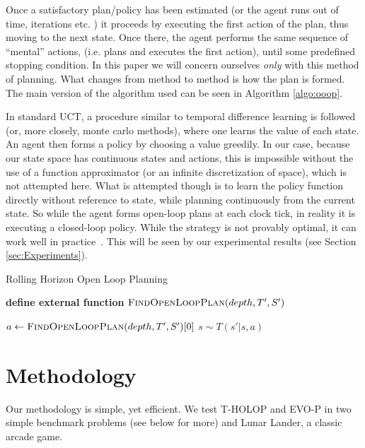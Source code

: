 \documentclass[conference]{IEEEtran}
\newcommand{\mathsc}[1]{{\normalfont\textsc{#1}}}
\begin{document}
Once a satisfactory plan/policy has been estimated (or the agent runs out of time, iterations etc. ) it proceeds by executing the first action of the plan, thus moving to the next state. Once there, the agent performs the same sequence of ``mental'' actions, (i.e. plans and executes the first action), until some predefined stopping condition.  In this paper we will concern ourselves \textit{only} with this method of planning. What changes from method to method is how the plan is formed. The main version of the algorithm used can be seen in Algorithm \ref{algo:ooop}.

In standard UCT, a procedure similar to temporal difference learning is followed (or, more closely, monte carlo methods), where one learns the value of each state. An agent then forms a policy by choosing a value greedily. In our case, because our state space has continuous states and actions, this is impossible without the use of a function approximator (or an infinite discretization of space), which is not attempted here. What is attempted though is to learn the policy function directly without reference to state, while planning continuously from the current state. So while the agent forms open-loop plans at each clock tick, in reality it is executing a closed-loop policy. While the strategy is not provably optimal, it can work well in practice~\cite{weinstein2012bandit}. This will be seen by our experimental results (see Section \ref{sec:Experiments}). 



\begin{algorithm}[!ht]
\caption{Rolling Horizon Open Loop Planning}\label{algo:ooop}
\begin{algorithmic}

\State 	\textbf{define external function} $\mathsc{FindOpenLoopPlan} (depth, T',S') $ 


	\Procedure{$\mathsc{OOP}$} {}
		    \State $a \gets \mathsc{FindOpenLoopPlan}(depth, T',S')[0]$ 
		    \State $s \sim T(s'|s,a)$ 
		\EndWhile
		\State
	\EndProcedure



\end{algorithmic}
\end{algorithm}


\section{Methodology} \label{sec:methodology}
Our methodology is simple, yet efficient. We test T-HOLOP and EVO-P in two simple benchmark problems (see below for more) and Lunar Lander, a classic arcade game. 
\end{document}
